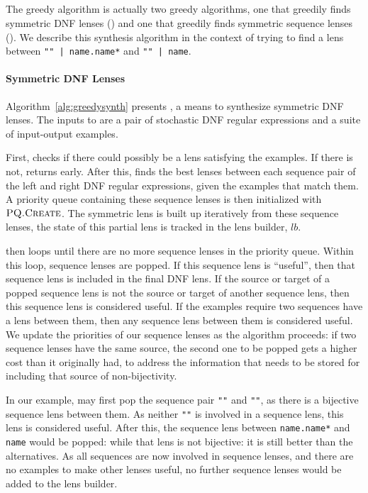 \documentclass[acmsmall,screen,anonymous]{acmart}
\begin{document}
\subsection{\GreedySynth}
\label{subsec:greedy-synth}
The greedy algorithm is actually two greedy algorithms, one that greedily finds
symmetric DNF lenses (\GreedySynth) and one that greedily finds symmetric
sequence lenses (\GreedySeqSynth). We describe this synthesis algorithm in the
context of trying to find a lens between \lstinline{"" | name.name*} and
\lstinline{"" | name}.

\paragraph*{Symmetric DNF Lenses} Algorithm~\ref{alg:greedysynth} presents
\GreedySynth, a means to synthesize symmetric DNF lenses. The inputs to
\GreedySynth are a pair of stochastic DNF regular expressions and a suite of
input-output examples.

First,  checks if there could possibly be a lens satisfying the
examples. If there is not, \GreedySynth returns \None early. After this,
\GreedySynth finds the best lenses between each sequence pair of the left and
right DNF regular expressions, given the examples that match them. A priority
queue containing these sequence lenses is then initialized with
$\PCF{PQ.Create}$. The symmetric lens is built up iteratively from these
sequence lenses, the state of this partial lens is tracked in the lens builder,
$lb$.

\GreedySynth then loops until there are no more sequence lenses in the priority
queue. Within this loop, sequence lenses are popped. If this sequence lens is
``useful'', then that sequence lens is included in the final DNF lens. If the
source or target of a popped sequence lens is not the source or target of
another sequence lens, then this sequence lens is considered useful. If the
examples require two sequences have a lens between them, then any sequence lens
between them is considered useful. We update the priorities of our sequence
lenses as the algorithm proceeds: if two sequence lenses have the same source,
the second one to be popped gets a higher cost than it originally had, to
address the information that needs to be stored for including that source of
non-bijectivity.

In our example, \GreedySynth may first pop the sequence pair \lstinline{""} and
\lstinline{""}, as there is a bijective sequence lens between them. As neither
\lstinline{""} is involved in a sequence lens, this lens is considered useful.
After this, the sequence lens between \lstinline{name.name*} and
\lstinline{name} would be popped: while that lens is not bijective: it is still
better than the alternatives. As all sequences are now involved in sequence lenses,
and there are no examples to make other lenses useful, no further sequence
lenses would be added to the lens builder.
\end{document}
